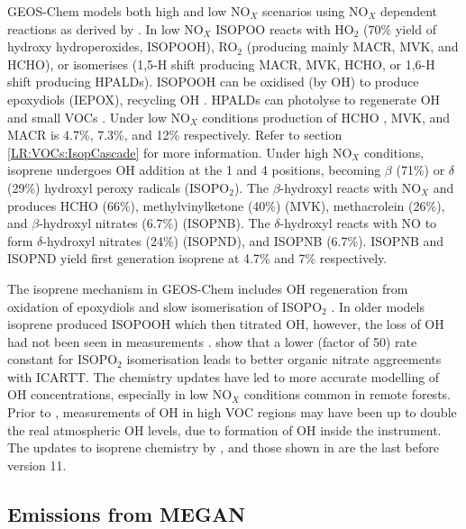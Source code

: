     GEOS-Chem models both high and low NO$_X$ scenarios using NO$_X$ dependent reactions as derived by \textcite{Paulot2009a,Mao2013}.
    In low NO$_X$ ISOPOO reacts with HO$_2$ ($70\%$ yield of hydroxy hydroperoxides, ISOPOOH), RO$_2$ (producing mainly MACR, MVK, and HCHO), or isomerises (1,5-H shift producing MACR, MVK, HCHO, or 1,6-H shift producing HPALDs). 
    ISOPOOH can be oxidised (by OH) to produce epoxydiols (IEPOX), recycling OH \parencite{Paulot2009b}. 
    HPALDs can photolyse to regenerate OH and small VOCs \parencite{Crounse2011,Wolfe2012, Peeters2014}.
    Under low NO$_X$ conditions production of HCHO , MVK, and MACR is 4.7\%, 7.3\%, and 12\% respectively.
    Refer to section \ref{LR:VOCs:IsopCascade} for more information.
    Under high NO$_X$ conditions, isoprene undergoes OH addition at the 1 and 4 positions, becoming $\beta$ (71\%) or $\delta$ (29\%) hydroxyl peroxy radicals (ISOPO$_2$). 
    The $\beta$-hydroxyl reacts with NO$_X$ and produces HCHO (66\%), methylvinylketone (40\%) (MVK), methacrolein (26\%), and $\beta$-hydroxyl nitrates (6.7\%) (ISOPNB).
    The $\delta$-hydroxyl reacts with NO to form $\delta$-hydroxyl nitrates (24\%) (ISOPND), and ISOPNB (6.7\%).
    ISOPNB and ISOPND yield first generation isoprene at 4.7\% and 7\% respectively.
    
    The isoprene mechanism in GEOS-Chem includes OH regeneration from oxidation of epoxydiols and slow isomerisation of ISOPO$_2$ \parencite{Mao2013}.
    In older models isoprene produced ISOPOOH which then titrated OH, however, the loss of OH had not been seen in measurements \parencite{Paulot2009b,Mao2013}.
    \textcite{Mao2013} show that a lower (factor of 50) rate constant for ISOPO$_2$ isomerisation leads to better organic nitrate aggreements with ICARTT. 
    The chemistry updates have led to more accurate modelling of OH concentrations, especially in low NO$_X$ conditions common in remote forests.
    Prior to \textcite{Mao2012}, measurements of OH in high VOC regions may have been up to double the real atmospheric OH levels, due to formation of OH inside the instrument.    
    The updates to isoprene chemistry by \textcite{Mao2013}, and those shown in \textcite{Crounse2011,Crounse2012} are the last before version 11.  

  
  
  \subsection{Emissions from MEGAN}
    \label{Model:GC:Isop:MEGAN}


